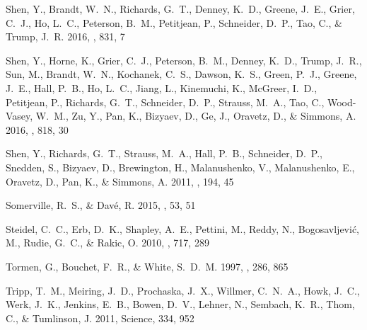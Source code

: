\documentclass[iop]{emulateapj}
\begin{document}
\begin{thebibliography}{45}
{Shen}, Y., {Brandt}, W.~N., {Richards}, G.~T., {Denney}, K.~D., {Greene},
  J.~E., {Grier}, C.~J., {Ho}, L.~C., {Peterson}, B.~M., {Petitjean}, P.,
  {Schneider}, D.~P., {Tao}, C., \& {Trump}, J.~R. 2016{}, \apj,
  831, 7

{Shen}, Y., {Horne}, K., {Grier}, C.~J., {Peterson}, B.~M., {Denney}, K.~D.,
  {Trump}, J.~R., {Sun}, M., {Brandt}, W.~N., {Kochanek}, C.~S., {Dawson},
  K.~S., {Green}, P.~J., {Greene}, J.~E., {Hall}, P.~B., {Ho}, L.~C., {Jiang},
  L., {Kinemuchi}, K., {McGreer}, I.~D., {Petitjean}, P., {Richards}, G.~T.,
  {Schneider}, D.~P., {Strauss}, M.~A., {Tao}, C., {Wood-Vasey}, W.~M., {Zu},
  Y., {Pan}, K., {Bizyaev}, D., {Ge}, J., {Oravetz}, D., \& {Simmons}, A.
  2016{}, \apj, 818, 30

{Shen}, Y., {Richards}, G.~T., {Strauss}, M.~A., {Hall}, P.~B., {Schneider},
  D.~P., {Snedden}, S., {Bizyaev}, D., {Brewington}, H., {Malanushenko}, V.,
  {Malanushenko}, E., {Oravetz}, D., {Pan}, K., \& {Simmons}, A. 2011, \apjs,
  194, 45

{Somerville}, R.~S., \& {Dav{\'e}}, R. 2015, \araa, 53, 51

{Steidel}, C.~C., {Erb}, D.~K., {Shapley}, A.~E., {Pettini}, M., {Reddy}, N.,
  {Bogosavljevi{\'c}}, M., {Rudie}, G.~C., \& {Rakic}, O. 2010, \apj, 717, 289

{Tormen}, G., {Bouchet}, F.~R., \& {White}, S.~D.~M. 1997, \mnras, 286, 865

{Tripp}, T.~M., {Meiring}, J.~D., {Prochaska}, J.~X., {Willmer}, C.~N.~A.,
  {Howk}, J.~C., {Werk}, J.~K., {Jenkins}, E.~B., {Bowen}, D.~V., {Lehner}, N.,
  {Sembach}, K.~R., {Thom}, C., \& {Tumlinson}, J. 2011, Science, 334, 952


\end{thebibliography}
\end{document}
